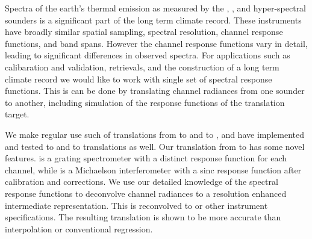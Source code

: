 
Spectra of the earth's thermal emission as measured by the {\airs},
{\cris}, and {\iasi} hyper-spectral sounders is a significant part
of the long term climate record.  These instruments have broadly
similar spatial sampling, spectral resolution, channel response
functions, and band spans.  However the channel response functions
vary in detail, leading to significant differences in observed
spectra.  For applications such as calibaration and validation,
retrievals, and the construction of a long term climate record we
would like to work with single set of spectral response functions.
This is can be done by translating channel radiances from one
sounder to another, including simulation of the response functions
of the translation target.  

We make regular use such of translations from {\airs} to 
{\cris} and {\iasi} to {\cris}, and have implemented and tested
{\iasi} to {\airs} and {\cris} to {\airs} translations as well.  
Our translation from {\airs} to {\cris} has some novel features.
{\airs} is a grating spectrometer with a distinct response function
for each channel, while {\cris} is a Michaelson interferometer with
a sinc response function after calibration and corrections.  We use
our detailed knowledge of the {\airs} spectral response functions to
deconvolve {\airs} channel radiances to a resolution enhanced
intermediate representation.  This is reconvolved to {\cris} or
other instrument specifications.  The resulting translation is shown
to be more accurate than interpolation or conventional regression.

